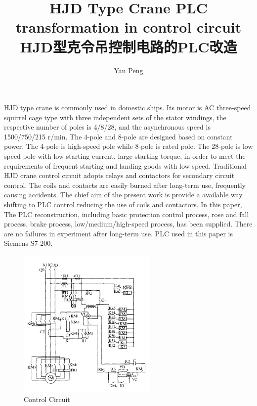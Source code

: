 \documentclass[a4paper,13pt]{article}
\begin{document}
\title{HJD Type Crane PLC transformation in control circuit \\HJD型克令吊控制电路的PLC改造}
\author{Yan Peng}
\date{}
\maketitle 
\noindent %
HJD type crane is commonly used in domestic ships. Its motor is AC three-speed squirrel cage type with three independent sets of the stator windings, the respective number of poles is 4/8/28, and the asynchronous speed is 1500/750/215 r/min. The 4-pole and 8-pole are designed based on constant power. The 4-pole is high-speed pole while 8-pole is rated pole. The 28-pole is low speed pole with low starting current, large starting torque, in order to meet the requirements of frequent starting and landing goods with low speed. Traditional HJD crane control circuit adopts relays and contactors for secondary circuit control. The coils and contacts are easily burned after long-term use, frequently causing accidents. The chief aim of the present work is provide a available way shifting to PLC control reducing the use of coils and contactors. In this paper, The PLC reconstruction, including basic protection control process, rose and fall process, brake process, low/medium/high-speed process, has been supplied. There are no failures in experiment after long-term use. PLC used in this paper is Siemens S7-200.
\begin{figure}[h]  %
\centering
\includegraphics[width=0.6\textwidth]{circuit.png} 
\caption{Control Circuit}
\end{figure}
\end{document}
